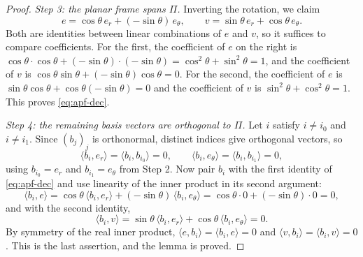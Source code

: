 \begin{proof}
\emph{Step 3: the planar frame spans $\Pi$.} Inverting the rotation, we claim
\begin{equation}\label{eq:apf-dec}
  e=\cos\theta\,e_r+(-\sin\theta)\,e_\theta,
  \qquad
  v=\sin\theta\,e_r+\cos\theta\,e_\theta .
\end{equation}
Both are identities between linear combinations of $e$ and $v$, so it suffices
to compare coefficients. For the first, the coefficient of $e$ on the right is
$\cos\theta\cdot\cos\theta+(-\sin\theta)\cdot(-\sin\theta)
=\cos^2\theta+\sin^2\theta=1$, and the coefficient of $v$ is
$\cos\theta\sin\theta+(-\sin\theta)\cos\theta=0$. For the second, the
coefficient of $e$ is $\sin\theta\cos\theta+\cos\theta(-\sin\theta)=0$ and the
coefficient of $v$ is $\sin^2\theta+\cos^2\theta=1$. This proves
\eqref{eq:apf-dec}.

\emph{Step 4: the remaining basis vectors are orthogonal to $\Pi$.} Let $i$
satisfy $i\ne i_0$ and $i\ne i_1$. Since $(b_j)_j$ is orthonormal, distinct
indices give orthogonal vectors, so
\[
  \langle b_i,e_r\rangle=\langle b_i,b_{i_0}\rangle=0,
  \qquad
  \langle b_i,e_\theta\rangle=\langle b_i,b_{i_1}\rangle=0 ,
\]
using $b_{i_0}=e_r$ and $b_{i_1}=e_\theta$ from Step 2. Now pair $b_i$ with the
first identity of \eqref{eq:apf-dec} and use linearity of the inner product in
its second argument:
\[
  \langle b_i,e\rangle
  =\cos\theta\,\langle b_i,e_r\rangle+(-\sin\theta)\,\langle b_i,e_\theta\rangle
  =\cos\theta\cdot 0+(-\sin\theta)\cdot 0=0 ,
\]
and with the second identity,
\[
  \langle b_i,v\rangle
  =\sin\theta\,\langle b_i,e_r\rangle+\cos\theta\,\langle b_i,e_\theta\rangle
  =0 .
\]
By symmetry of the real inner product, $\langle e,b_i\rangle=\langle b_i,e\rangle=0$
and $\langle v,b_i\rangle=\langle b_i,v\rangle=0$. This is the last assertion,
and the lemma is proved.
\end{proof}
